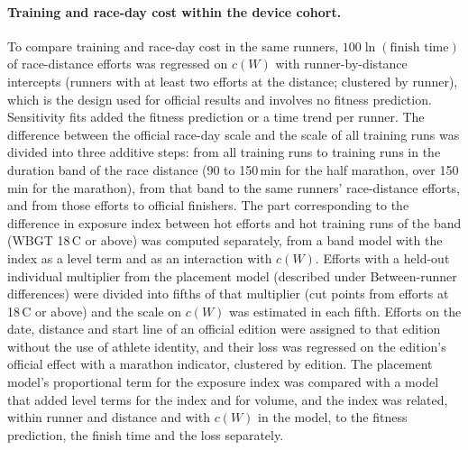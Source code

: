 \documentclass[12pt]{article}
\newcommand{\degC}{\,\textdegree C}
\newcommand{\cW}{$c(W)$}
\begin{document}
\paragraph{Training and race-day cost within the device cohort.} To compare training and race-day cost in the same runners, $100 \ln(\text{finish time})$ of race-distance efforts was regressed on \cW{} with runner-by-distance intercepts (runners with at least two efforts at the distance; clustered by runner), which is the design used for official results and involves no fitness prediction. Sensitivity fits added the fitness prediction or a time trend per runner. The difference between the official race-day scale and the scale of all training runs was divided into three additive steps: from all training runs to training runs in the duration band of the race distance (90 to 150\,min for the half marathon, over 150\,min for the marathon), from that band to the same runners' race-distance efforts, and from those efforts to official finishers. The part corresponding to the difference in exposure index between hot efforts and hot training runs of the band (WBGT 18\degC{} or above) was computed separately, from a band model with the index as a level term and as an interaction with \cW. Efforts with a held-out individual multiplier from the placement model (described under Between-runner differences) were divided into fifths of that multiplier (cut points from efforts at 18\degC{} or above) and the scale on \cW{} was estimated in each fifth. Efforts on the date, distance and start line of an official edition were assigned to that edition without the use of athlete identity, and their loss was regressed on the edition's official effect with a marathon indicator, clustered by edition. The placement model's proportional term for the exposure index was compared with a model that added level terms for the index and for volume, and the index was related, within runner and distance and with \cW{} in the model, to the fitness prediction, the finish time and the loss separately.
\end{document}
